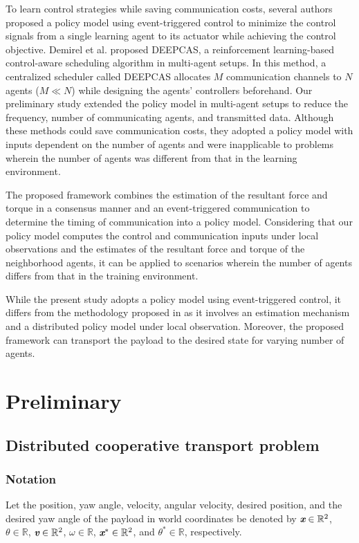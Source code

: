 \documentclass[letterpaper, 10 pt, conference]{ieeeconf} %
\begin{document}
To learn control strategies while saving communication costs, several authors \cite{Baumann2018, Funk2020} proposed a policy model using event-triggered control to minimize the control signals from a single learning agent to its actuator while achieving the control objective.
Demirel et al. \cite{Demirel2018} proposed DEEPCAS, a reinforcement learning-based control-aware scheduling algorithm in multi-agent setups. In this method, a centralized scheduler called DEEPCAS allocates $M$ communication channels to $N$ agents ($M\ll N$) while designing the agents' controllers beforehand.
Our preliminary study \cite{Shibata2021} extended the policy model \cite{Baumann2018, Funk2020} in multi-agent setups to reduce the frequency, number of communicating agents, and transmitted data. Although these methods could save communication costs, they adopted a policy model with inputs dependent on the number of agents and were inapplicable to problems wherein the number of agents was different from that in the learning environment.

The proposed framework combines the estimation of the resultant force and torque in a consensus manner and an event-triggered communication to determine the timing of communication into a policy model. Considering that our policy model computes the control and communication inputs under local observations and the estimates of the resultant force and torque of the neighborhood agents, it can be applied to scenarios wherein the number of agents differs from that in the training environment.

While the present study adopts a policy model using event-triggered control, it differs from the methodology proposed in \cite{Baumann2018, Funk2020, Shibata2021} as it involves an estimation mechanism and a distributed policy model under local observation. Moreover, the proposed framework can transport the payload to the desired state for varying number of agents.

\section{Preliminary}
\subsection{Distributed cooperative transport problem}

\subsubsection{Notation}
Let the position, yaw angle, velocity, angular velocity, desired position, and the desired yaw angle of the payload in world coordinates be denoted by $\textit{\textbf{x}}\in \mathbb{R}^2$, $\theta \in \mathbb{R}$, $\textit{\textbf{v}}\in \mathbb{R}^2$, $\omega\in \mathbb{R}$, $\textit{\textbf{x}}^{\ast} \in \mathbb{R}^2$, and $\theta^{\ast} \in \mathbb{R}$, respectively.
\end{document}
